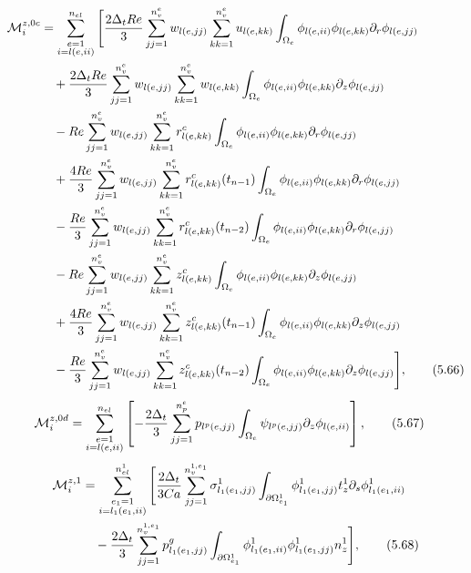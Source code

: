 \documentclass{article}
\begin{document}
\begin{align}
\mathcal{M}_i^{z,0c} &= \sum_{\substack{e=1\\ i=l(e,ii)}}^{n_{el}} \Bigg[ \frac{2\Delta_t Re}{3} \sum_{jj=1}^{n_v^e} w_{l(e,jj)} \sum_{kk=1}^{n_v^e} u_{l(e,kk)} \int_{\Omega_e} \phi_{l(e,ii)} \phi_{l(e,kk)} \partial_r \phi_{l(e,jj)} \nonumber\\
&\quad + \frac{2\Delta_t Re}{3} \sum_{jj=1}^{n_v^e} w_{l(e,jj)} \sum_{kk=1}^{n_v^e} w_{l(e,kk)} \int_{\Omega_e} \phi_{l(e,ii)} \phi_{l(e,kk)} \partial_z \phi_{l(e,jj)} \nonumber\\
&\quad - Re \sum_{jj=1}^{n_v^e} w_{l(e,jj)} \sum_{kk=1}^{n_v^e} r_{l(e,kk)}^c \int_{\Omega_e} \phi_{l(e,ii)} \phi_{l(e,kk)} \partial_r \phi_{l(e,jj)} \nonumber\\
&\quad + \frac{4Re}{3} \sum_{jj=1}^{n_v^e} w_{l(e,jj)} \sum_{kk=1}^{n_v^e} r_{l(e,kk)}^c(t_{n-1}) \int_{\Omega_e} \phi_{l(e,ii)} \phi_{l(e,kk)} \partial_r \phi_{l(e,jj)} \nonumber\\
&\quad - \frac{Re}{3} \sum_{jj=1}^{n_v^e} w_{l(e,jj)} \sum_{kk=1}^{n_v^e} r_{l(e,kk)}^c(t_{n-2}) \int_{\Omega_e} \phi_{l(e,ii)} \phi_{l(e,kk)} \partial_r \phi_{l(e,jj)} \nonumber\\
&\quad - Re \sum_{jj=1}^{n_v^e} w_{l(e,jj)} \sum_{kk=1}^{n_v^e} z_{l(e,kk)}^c \int_{\Omega_e} \phi_{l(e,ii)} \phi_{l(e,kk)} \partial_z \phi_{l(e,jj)} \nonumber\\
&\quad + \frac{4Re}{3} \sum_{jj=1}^{n_v^e} w_{l(e,jj)} \sum_{kk=1}^{n_v^e} z_{l(e,kk)}^c(t_{n-1}) \int_{\Omega_e} \phi_{l(e,ii)} \phi_{l(e,kk)} \partial_z \phi_{l(e,jj)} \nonumber\\
&\quad - \frac{Re}{3} \sum_{jj=1}^{n_v^e} w_{l(e,jj)} \sum_{kk=1}^{n_v^e} z_{l(e,kk)}^c(t_{n-2}) \int_{\Omega_e} \phi_{l(e,ii)} \phi_{l(e,kk)} \partial_z \phi_{l(e,jj)} \Bigg], \tag{5.66}
\end{align}
\begin{align}
\mathcal{M}_i^{z,0d} &= \sum_{\substack{e=1\\ i=l(e,ii)}}^{n_{el}} \left[ -\frac{2\Delta_t}{3} \sum_{jj=1}^{n_p^e} p_{l^p(e,jj)} \int_{\Omega_e} \psi_{l^p(e,jj)} \partial_z \phi_{l(e,ii)} \right], \tag{5.67}
\end{align}
\begin{align}
\mathcal{M}_i^{z,1} &= \sum_{\substack{e_1=1\\ i=l_1(e_1,ii)}}^{n_{el}^1} \Bigg[ \frac{2\Delta_t}{3Ca} \sum_{jj=1}^{n_v^{1,e_1}} \sigma_{l_1(e_1,jj)}^1 \int_{\partial \Omega_{e_1}^1} \phi_{l_1(e_1,jj)}^1 t_z^1 \partial_s \phi_{l_1(e_1,ii)}^1 \nonumber\\
&\quad - \frac{2\Delta_t}{3} \sum_{jj=1}^{n_v^{1,e_1}} p_{l_1(e_1,jj)}^g \int_{\partial \Omega_{e_1}^1} \phi_{l_1(e_1,ii)}^1 \phi_{l_1(e_1,jj)}^1 n_z^1 \Bigg], \tag{5.68}
\end{align}
\end{document}
